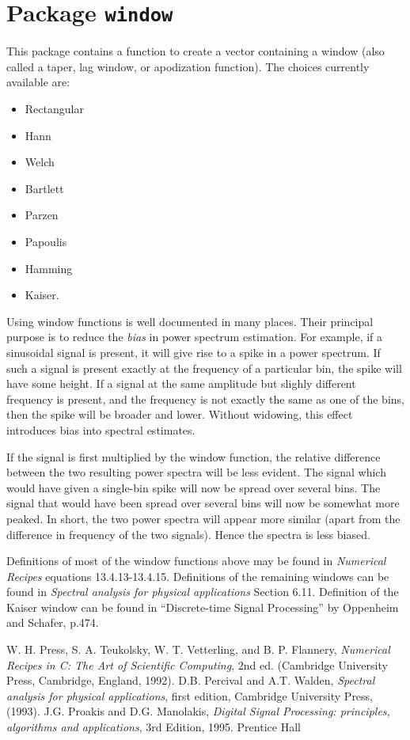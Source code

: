 \chapter{Package \texttt{window}}

This package contains a function to create a vector
containing a window (also called
a taper, lag window, or apodization function).  The choices
currently available are:
\begin{itemize}
\item Rectangular
\item Hann
\item Welch
\item Bartlett
\item Parzen
\item Papoulis
\item Hamming
\item Kaiser.
\end{itemize}
Using window functions is well documented in many places.  Their
principal purpose is to reduce the {\it bias} in power spectrum
estimation.  For example, if a sinusoidal signal is present, it will
give rise to a spike in a power spectrum.  If such a  signal is present
exactly at the frequency of a particular bin, the spike will have some
height.  If a signal at the same amplitude but slighly different
frequency is present, and the frequency is not exactly the same
as one of the bins, then
the spike will be broader and lower. Without widowing, this effect introduces
bias into spectral estimates.

If the signal is first multiplied by the window function, the
relative difference between the two resulting power spectra will be
less evident.  The signal which would have given a single-bin spike
will now be spread over several bins.  The signal that would have
been spread over several bins will now be somewhat more peaked.
In short, the two power spectra will appear more similar (apart from
the difference in frequency of the two signals).  Hence the spectra
is less biased.

Definitions of most of the window functions above may be found in {\it
Numerical Recipes} \cite{numrec} equations 13.4.13-13.4.15.  Definitions of
the remaining windows can be found in {\it Spectral analysis for physical
applications} \cite{pw} Section 6.11. Definition of the Kaiser window can be
found in ``Discrete-time Signal Processing'' by Oppenheim and Schafer, p.474.



\newpage
\newpage\begin{thebibliography}{0}
W. H. Press, S. A. Teukolsky, W. T. Vetterling, and B. P. Flannery,
  \textit{Numerical Recipes in C: The Art of Scientific Computing}, 2nd ed.
  (Cambridge University Press, Cambridge, England, 1992).
D.B. Percival and A.T. Walden, {\it Spectral analysis for physical applications}, first edition, Cambridge University Press, (1993).
J.G. Proakis and D.G. Manolakis, {\it Digital
Signal Processing: principles, algorithms and applications},
3rd Edition, 1995.
Prentice Hall
\end{thebibliography}
